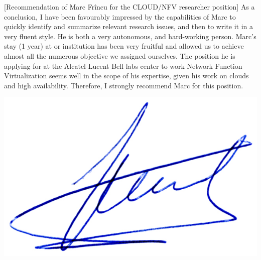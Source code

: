 \documentclass[a4paper,10pt]{article}
\begin{document}
\begin{letter}[Recommendation of Marc Fr\^incu for the CLOUD/NFV researcher
    position]
As a conclusion, I have been favourably impressed by the capabilities of Marc to
quickly identify and summarize relevant research issues, and then to write it in
a very  fluent style.  He  is both a  very autonomous, and  hard-working person.
Marc's stay (1 year) at or institution  has been very fruitful and allowed us to
achieve almost all  the numerous objective we assigned  ourselves.  The position
he  is applying  for at  the  Alcatel-Lucent Bell  labs center  to work  Network
Function Virtualization seems well in the scope of his expertise, given his work
on clouds and high availability.  Therefore,  I strongly recommend Marc for this
position.


\end{letter}
\begin{flushright}
\includegraphics[width=.30\textwidth]{signgenaud.jpg}
\end{flushright}
%
%
\end{document}
